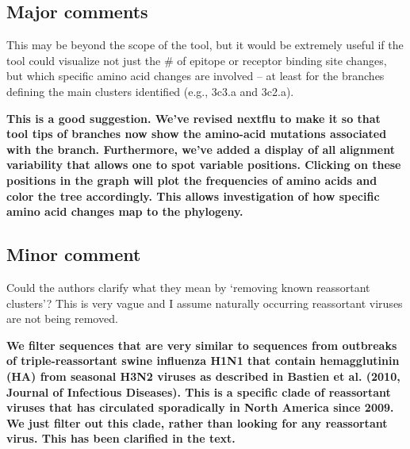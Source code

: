 \documentclass[11pt,oneside,letterpaper]{article}
\begin{document}
\subsection*{Major comments}

This may be beyond the scope of the tool, but it would be extremely useful if the tool could visualize not just the \# of epitope or receptor binding site changes, but which specific amino acid changes are involved -- at least for the branches defining the main clusters identified (e.g., 3c3.a and 3c2.a).

{\bf This is a good suggestion. We've revised nextflu to make it so that tool tips of branches now show the amino-acid mutations associated with the branch. Furthermore, we've added a display of all alignment variability that allows one to spot variable positions. Clicking on these positions in the graph will plot the frequencies of amino acids and color the tree accordingly. This allows investigation of how specific amino acid changes map to the phylogeny.}

\subsection*{Minor comment}

Could the authors clarify what they mean by `removing known reassortant clusters'?  This is very vague and I assume naturally occurring reassortant viruses are not being removed.

{\bf We filter sequences that are very similar to sequences from outbreaks of triple-reassortant swine influenza H1N1 that contain hemagglutinin (HA) from seasonal H3N2 viruses as described in Bastien et al. (2010, Journal of Infectious Diseases). This is a specific clade of reassortant viruses that has circulated sporadically in North America since 2009. We just filter out this clade, rather than looking for any reassortant virus. This has been clarified in the text.}
\end{document}
